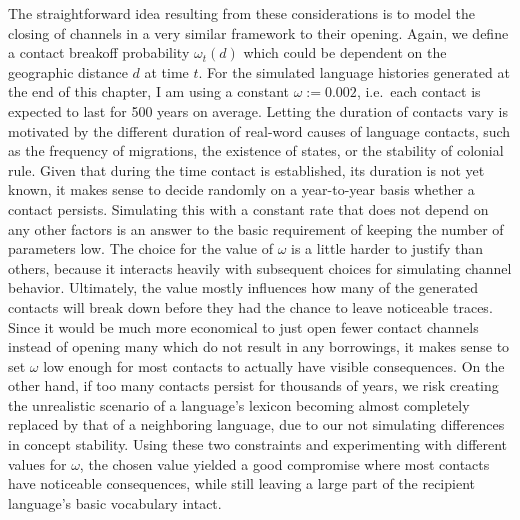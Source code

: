 The straightforward idea resulting from these considerations is to model the closing of channels in a very similar framework to their opening. Again, we define a contact breakoff probability $\omega_t(d)$ which could be dependent on the geographic distance $d$ at time $t$. For the simulated language histories generated at the end of this chapter, I am using a constant $\omega := 0.002$, i.e.\ each contact is expected to last for 500 years on average. Letting the duration of contacts vary is motivated by the different duration of real-word causes of language contacts, such as the frequency of migrations, the existence of states, or the stability of colonial rule. Given that during the time contact is established, its duration is not yet known, it makes sense to decide randomly on a year-to-year basis whether a contact persists. Simulating this with a constant rate that does not depend on any other factors is an answer to the basic requirement of keeping the number of parameters low. The choice for the value 
of $\omega$ is a little harder to justify than others, because it interacts heavily with subsequent choices for simulating channel behavior. Ultimately, the value mostly influences how many of the generated contacts will break down before they had the chance to leave noticeable traces. Since it would be much more economical to just open fewer contact channels instead of opening many which do not result in any borrowings, it makes sense to set $\omega$ low enough for most contacts to actually have visible consequences. On the other hand, if too many contacts persist for thousands of years, we risk creating the unrealistic scenario of a language's lexicon becoming almost completely replaced by that of a neighboring language, due to our not simulating differences in concept stability. Using these two constraints and experimenting with different values for $\omega$, the chosen value yielded a good compromise where most contacts have noticeable consequences, while still leaving a large part of the recipient 
language's basic vocabulary intact.

